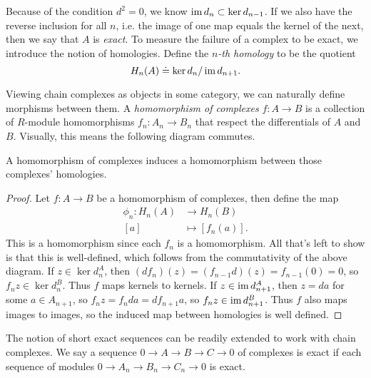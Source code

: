 \documentclass[twoside,10pt]{article}
\begin{document}
Because of the condition $d^2=0$, we know $\operatorname{im} d_n \subset \ker d_{n-1}$. If we also have the reverse inclusion for all $n$, i.e. the image of one map equals the kernel of the next, then we say that $A$ is \textit{exact}. To measure the failure of a complex to be exact, we introduce the notion of homologies. Define the $n$\textit{-th homology} to be the quotient
\[
	H_{n}(A) \doteq \ker d_n / \operatorname{im} d_{n+1}.
\] 

Viewing chain complexes as objects in some category, we can naturally define morphisms between them. A \textit{homomorphism of complexes} $f:A\to B$ is a collection of $R$-module homomorphisms $f_{n}:A_{n}\to B_{n}$ that respect the differentials of $A$ and $B$. Visually, this means the following diagram commutes.
\begin{center}
\end{center}

\begin{prop}
	\label{prop:induced-homo}
A homomorphism of complexes induces a homomorphism between those complexes' homologies.
\end{prop}
\begin{proof}
	Let $f:A\to B$ be a homomorphism of complexes, then define the map
	\begin{align*}
		\phi_n:H_{n}(A)&\to H_{n}(B)\\
		[a]&\mapsto [f_n(a)].
	\end{align*}
This is a homomorphism since each $f_{n}$ is a homomorphism. All that's left to show is that this is well-defined, which follows from the commutativity of the above diagram. If $z \in \ker d_{n}^A$, then $(df_{n})(z) = (f_{n-1}d)(z) = f_{n-1}(0) = 0$, so $f_{n}z \in \ker d_{n}^{B}$. Thus $f$ maps kernels to kernels. If $z \in \operatorname{im} d_{n+1}^{A}$, then $z=da$ for some $a \in A_{n+1}$, so $f_{n}z=f_{n}da = df_{n+1}a$, so $f_{n}z \in \operatorname{im} d_{n+1}^{B}$. Thus $f$ also maps images to images, so the induced map between homologies is well defined.
\end{proof}

The notion of short exact sequences can be readily extended to work with chain complexes. We say a sequence $0\to A\to B\to C \to 0$ of complexes is exact if each sequence of modules $0 \to A_{n}\to B_{n}\to C_{n} \to 0$ is exact.
\end{document}
